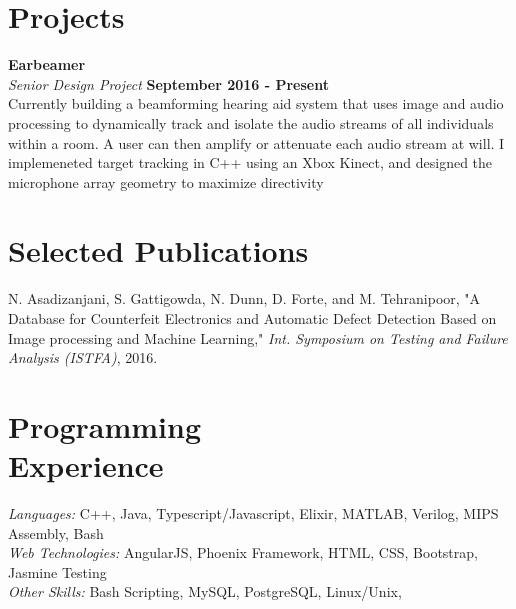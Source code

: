 \documentclass[margin,line]{resume}
\begin{document}
\begin{resume}
\section{\mysidestyle Projects}

    \textbf{Earbeamer}\vspace{2mm}\\\vspace{1mm}%
    \textsl{Senior Design Project} \hfill \textbf{September 2016 - Present}\\
    Currently building a beamforming hearing aid system that uses image and audio processing to dynamically track and isolate the audio streams of all individuals within a room. A user can then amplify or attenuate each audio stream at will. I implemeneted target tracking in C++ using an Xbox Kinect, and designed the microphone array geometry to maximize directivity

   \section{\mysidestyle Selected Publications}
   N. Asadizanjani, S. Gattigowda, N. Dunn, D. Forte, and M. Tehranipoor, "A Database for Counterfeit Electronics and Automatic Defect Detection Based on Image processing and Machine Learning," \textsl{Int. Symposium on Testing and Failure Analysis (ISTFA)}, 2016.
\vspace{-2mm}

    \section{\mysidestyle Programming\\Experience}

    \emph{Languages:} C++, Java, Typescript/Javascript, Elixir, MATLAB, Verilog, MIPS Assembly, Bash\\
    \emph{Web Technologies:} AngularJS, Phoenix Framework, HTML, CSS, Bootstrap, Jasmine Testing\\
    \emph{Other Skills:} Bash Scripting, MySQL, PostgreSQL, Linux/Unix, 
\end{resume}
\end{document}
